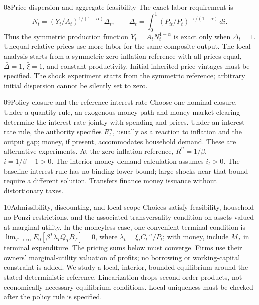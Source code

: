 \begin{modelsetup}[1]
\begin{modelcondition}{08}{Price dispersion and aggregate feasibility}
The exact labor requirement is
\[
 N_t=(Y_t/A_t)^{1/(1-\alpha)}\Delta_t,\qquad
 \Delta_t=\int_0^1(P_{it}/P_t)^{-\epsilon/(1-\alpha)}\,di.
\]
Thus the symmetric production function $Y_t=A_tN_t^{1-\alpha}$ is exact only
when $\Delta_t=1$. Unequal relative prices use more labor for the same composite
output. The local analysis starts from a symmetric zero-inflation reference
with all prices equal, $\bar\Delta=1$, $\bar\xi=1$, and constant productivity.
Initial inherited price vintages must be specified. The shock experiment starts
from the symmetric reference; arbitrary initial dispersion cannot be silently
set to zero.
\end{modelcondition}
\end{modelsetup}

\begin{modelsetup}[1]
\begin{modelcondition}{09}{Policy closure and the reference interest rate}
Choose one nominal closure. Under a quantity rule, an exogenous money path and
money-market clearing determine the interest rate jointly with spending and
prices. Under an interest-rate rule, the authority specifies $R_t^n$, usually
as a reaction to inflation and the output gap; money, if present, accommodates
household demand. These are alternative experiments. At the zero-inflation
reference, $\bar R^n=1/\beta$, $\bar i=1/\beta-1>0$.
The interior money-demand calculation assumes $i_t>0$. The baseline interest rule
has no binding lower bound; large shocks near that bound require a different
solution. Transfers finance money issuance without distortionary taxes.
\end{modelcondition}
\end{modelsetup}

\begin{modelsetup}[1]
\begin{modelcondition}{10}{Admissibility, discounting, and local scope}
Choices satisfy feasibility, household no-Ponzi restrictions, and the associated
transversality condition on assets valued at marginal utility. In the moneyless
case, one convenient terminal condition is
$\lim_{T\to\infty}E_0[\beta^T\lambda_T Q_TB_T]=0$,
where $\lambda_t=\xi_t C_t^{-\sigma}/P_t$; with money, include $M_T$ in
terminal expenditure. The pricing sums below must converge. Firms use their
owners' marginal-utility valuation of profits; no borrowing or working-capital
constraint is added. We study a local, interior, bounded equilibrium around
the stated deterministic reference. Linearization drops second-order products,
not economically necessary equilibrium conditions. Local uniqueness must be
checked after the policy rule is specified.
\end{modelcondition}
\end{modelsetup}


